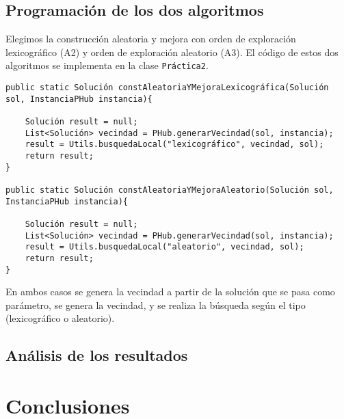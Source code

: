 \documentclass[12pt,a4paper,twoside,openright,titlepage,final]{article}
\begin{document}
\subsection{Programación de los dos algoritmos}

Elegimos la construcción aleatoria y mejora con orden de exploración lexicográfico (A2) y orden de exploración aleatorio (A3). El código de estos dos algoritmos se implementa en la clase \texttt{Práctica2}.

\begin{verbatim}
public static Solución constAleatoriaYMejoraLexicográfica(Solución sol, InstanciaPHub instancia){

    Solución result = null;
    List<Solución> vecindad = PHub.generarVecindad(sol, instancia);
    result = Utils.busquedaLocal("lexicográfico", vecindad, sol);
    return result;
}

public static Solución constAleatoriaYMejoraAleatorio(Solución sol, InstanciaPHub instancia){

    Solución result = null;
    List<Solución> vecindad = PHub.generarVecindad(sol, instancia);
    result = Utils.busquedaLocal("aleatorio", vecindad, sol);
    return result;
}
\end{verbatim}

En ambos casos se genera la vecindad a partir de la solución que se pasa como parámetro, se genera la vecindad, y se realiza la búsqueda según el tipo (lexicográfico o aleatorio).


\subsection{Análisis de los resultados}


\section{Conclusiones}
\end{document}
